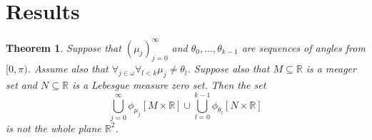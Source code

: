 \documentclass[12pt]{amsart}
\theoremstyle{plain}
\newtheorem{theorem}{Theorem}[section]
\theoremstyle{definition}
\theoremstyle{remark}
\newcommand{\real}{\mathbb{R}}
\begin{document}
\section{Results}

\begin{theorem}
  \label{theorem:main}
  Suppose that $(\mu_j)_{j=0}^\infty$ and $\theta_0,\ldots, \theta_{k-1}$
  are sequences of angles from $[0,\pi)$. Assume also that
  $\forall_{j\in\omega} \forall_{l<k} \mu_j\neq\theta_l$.
  Suppose also that $M \subseteq \real$ is a meager set and
  $N \subseteq \real$ is a Lebesgue measure zero set.
  Then the set
  \[
    \bigcup_{j = 0}^\infty \phi_{\mu_j}[M \times \real] \cup
    \bigcup_{l = 0}^{k-1} \phi_{\theta_l}[N \times \real]
  \]
  is not the whole plane $\real^2$.
\end{theorem}
\end{document}
